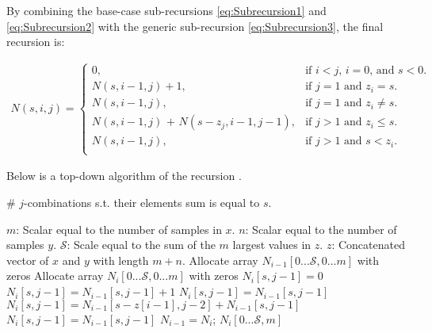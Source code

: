 \documentclass[a4paper,11pt]{article}
\begin{document}
By combining the base-case sub-recursions \ref{eq:Subrecursion1} and \ref{eq:Subrecursion2} with the generic sub-recursion \ref{eq:Subrecursion3}, the final recursion is:

\begin{align}
\label{eq:finalRecursion}
\text{$N(s,i,j)$}   =\begin{cases}
    0, & \text{if $i < j$, $i=0$, and $s < 0$.} \\
    \text{$N(s,i-1,j)$}+1, & \text{if $j=1$ and $z_{i}=s$}.\\
    \text{$N(s,i-1,j)$}, & \text{if $j=1$ and $z_{i}\neq s$}. \\
    \text{$N(s,i-1,j)$ + $N(s-z_{j},i-1,j-1)$}, & \text{if $j>1$ and $z_{i} \leq s$}. \\
    \text{$N(s,i-1,j)$}, & \text{if $j>1$ and $s < z_{i}$}. \\
  \end{cases}
\end{align}

Below is a top-down algorithm of the recursion \label{eq:finalRecursion}.

\FloatBarrier
\begin{algorithm}
\caption{\# $j$-combinations s.t. their elements sum is equal to $s$.}
\label{alg:combination}
\begin{algorithmic}[1]
\State $m$: Scalar equal to the number of samples in $x$.
\State $n$: Scalar equal to the number of samples $y$.
\State $\mathcal{S}$: Scale equal to the sum of the $m$ largest values in $z$.
\State $z$: Concatenated vector of $x$ and $y$ with length $m+n$.
    \State Allocate array $N_{i-1}[0...\mathcal{S},0...m]$ with zeros
    \State Allocate array $N_{i}[0...\mathcal{S},0...m]$ with zeros
                  \State $N_{i}[s,j-1]=0$
                  \State $N_{i}[s,j-1]=N_{i-1}[s,j-1] + 1$
                 \State $N_{i}[s,j-1]=N_{i-1}[s,j-1]$
                  \State $N_{i}[s,j-1]=N_{i-1}[s-z[i-1],j-2] + N_{i-1}[s,j-1]$
                 \State $N_{i}[s,j-1]=N_{i-1}[s,j-1]$
                \EndIf
            \EndFor
        \EndFor
        \State $N_{i-1} = N_{i}$; 
    \EndFor
        \State \Return $N_{i}[0...\mathcal{S},m]$ 

    \EndProcedure
\end{algorithmic}
\end{algorithm}
\FloatBarrier
\end{document}
